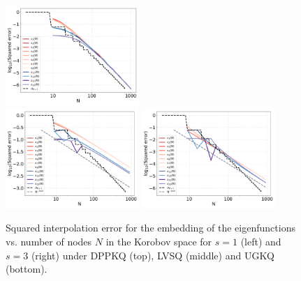 \documentclass[twoside,11pt]{book}
\numberwithin{theorem}{chapter}
\numberwithin{definition}{chapter}
\numberwithin{proposition}{chapter}
\numberwithin{corollary}{chapter}
\numberwithin{example}{chapter}
\numberwithin{lemma}{chapter}
\numberwithin{assumption}{chapter}
\begin{document}
\begin{figure}
\includegraphics[width=0.45\textwidth]{img/neurips/multiSobolev/LVSQ_multig_interpolation_Korobov_s_2_fig_1.pdf}\\
\includegraphics[width=0.45\textwidth]{img/neurips/multiSobolev/UGKQ_multig_interpolation_Korobov_s_1_fig_1.pdf}
\includegraphics[width=0.45\textwidth]{img/neurips/multiSobolev/UGKQ_multig_interpolation_Korobov_s_2_fig_1.pdf}\\
\caption{Squared interpolation error for the embedding of the eigenfunctions vs. number of nodes $N$ in the Korobov space for $s = 1$ (left) and $s=3$ (right) under DPPKQ (top), LVSQ (middle) and UGKQ (bottom).
\label{fig:Korobov_multig_results}}
\end{figure} 

\end{document}
